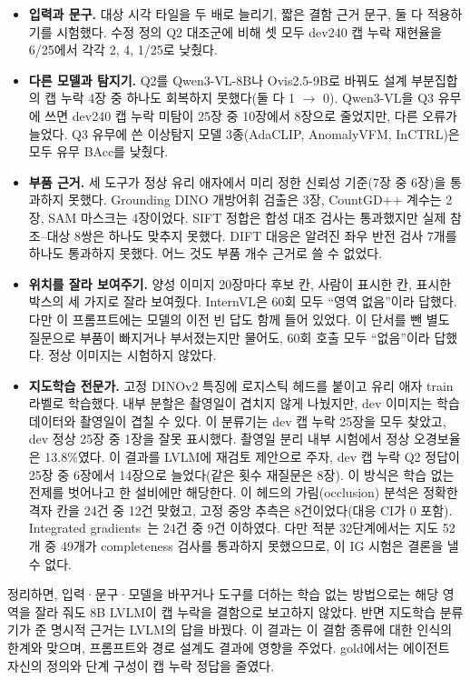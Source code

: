 \documentclass[11pt]{article}
\begin{document}
\begin{itemize}
  \item \textbf{입력과 문구.} 대상 시각 타일을 두 배로 늘리기, 짧은 결함 근거 문구, 둘 다 적용하기를 시험했다. 수정 정의 Q2 대조군에 비해 셋 모두 dev240 캡 누락 재현율을 6/25에서 각각 2, 4, 1/25로 낮췄다.
  \item \textbf{다른 모델과 탐지기.} Q2를 Qwen3-VL-8B나 Ovis2.5-9B로 바꿔도 설계 부분집합의 캡 누락 4장 중 하나도 회복하지 못했다(둘 다 1 $\rightarrow$ 0). Qwen3-VL을 Q3 유무에 쓰면 dev240 캡 누락 미탐이 25장 중 10장에서 8장으로 줄었지만, 다른 오류가 늘었다. Q3 유무에 쓴 이상탐지 모델 3종(AdaCLIP, AnomalyVFM, InCTRL)은 모두 유무 BAcc를 낮췄다.
  \item \textbf{부품 근거.} 세 도구가 정상 유리 애자에서 미리 정한 신뢰성 기준(7장 중 6장)을 통과하지 못했다. Grounding DINO 개방어휘 검출은 3장, CountGD++ 계수는 2장, SAM 마스크는 4장이었다. SIFT 정합은 합성 대조 검사는 통과했지만 실제 참조–대상 8쌍은 하나도 맞추지 못했다. DIFT 대응은 알려진 좌우 반전 검사 7개를 하나도 통과하지 못했다. 어느 것도 부품 개수 근거로 쓸 수 없었다.
  \item \textbf{위치를 잘라 보여주기.} 양성 이미지 20장마다 후보 칸, 사람이 표시한 칸, 표시한 박스의 세 가지로 잘라 보여줬다. InternVL은 60회 모두 ``영역 없음''이라 답했다. 다만 이 프롬프트에는 모델의 이전 빈 답도 함께 들어 있었다. 이 단서를 뺀 별도 질문으로 부품이 빠지거나 부서졌는지만 물어도, 60회 호출 모두 ``없음''이라 답했다. 정상 이미지는 시험하지 않았다.
  \item \textbf{지도학습 전문가.} 고정 DINOv2 특징에 로지스틱 헤드를 붙이고 유리 애자 train 라벨로 학습했다. 내부 분할은 촬영일이 겹치지 않게 나눴지만, dev 이미지는 학습 데이터와 촬영일이 겹칠 수 있다. 이 분류기는 dev 캡 누락 25장을 모두 찾았고, dev 정상 25장 중 1장을 잘못 표시했다. 촬영일 분리 내부 시험에서 정상 오경보율은 13.8\%였다. 이 결과를 LVLM에 재검토 제안으로 주자, dev 캡 누락 Q2 정답이 25장 중 6장에서 14장으로 늘었다(같은 횟수 재질문은 8장). 이 방식은 학습 없는 전제를 벗어나고 한 설비에만 해당한다. 이 헤드의 가림(occlusion) 분석은 정확한 격자 칸을 24건 중 12건 맞혔고, 고정 중앙 추측은 8건이었다(대응 CI가 0 포함). Integrated gradients~\cite{sundararajan2017ig}는 24건 중 9건 이하였다. 다만 적분 32단계에서는 지도 52개 중 49개가 completeness 검사를 통과하지 못했으므로, 이 IG 시험은 결론을 낼 수 없다.
\end{itemize}
정리하면, 입력·문구·모델을 바꾸거나 도구를 더하는 학습 없는 방법으로는 해당 영역을 잘라 줘도 8B LVLM이 캡 누락을 결함으로 보고하지 않았다. 반면 지도학습 분류기가 준 명시적 근거는 LVLM의 답을 바꿨다. 이 결과는 이 결함 종류에 대한 인식의 한계와 맞으며, 프롬프트와 경로 설계도 결과에 영향을 주었다. gold에서는 에이전트 자신의 정의와 단계 구성이 캡 누락 정답을 줄였다.
\end{document}
